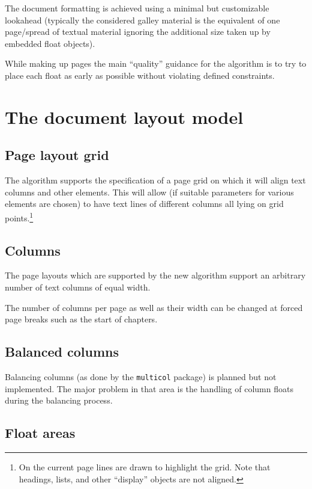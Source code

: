 \documentclass[twocolumn]{article}
\begin{document}
The document formatting is achieved using a minimal but customizable
lookahead (typically the considered galley material is the equivalent
of one page/\allowbreak spread of textual material ignoring the
additional size taken up by embedded float objects).

While making up pages the main ``quality'' guidance for the algorithm
is to try to place each float as early as possible without violating
defined constraints.


\ORspecial\ShowGridtrue


\section{The document layout model}

\subsection{Page layout grid}

The algorithm supports the specification of a page grid on which it
will align text columns and other elements.  This will allow (if
suitable parameters for various elements are chosen) to have text
lines of different columns all lying on grid points.\footnote{On the
current page lines are drawn to highlight the grid. Note that
headings, lists, and other ``display'' objects are not aligned.}

\subsection{Columns}

The page layouts which are supported by the new algorithm support
an arbitrary number of text columns of equal width.

The number of columns per page as well as their width can be changed
at forced page breaks such as the start of chapters.

\subsection{Balanced columns}

Balancing columns (as done by the \texttt{multicol} package) is planned
but not implemented. The major problem in that area is the handling of
column floats during the balancing process.


\subsection{Float areas}\label{overlap}
\end{document}
